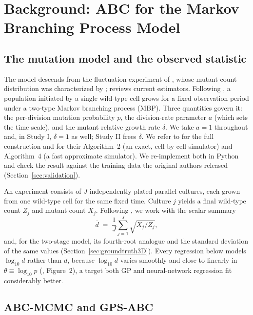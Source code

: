 \documentclass[sn-basic,iicol,pdflatex]{sn-jnl}
\newcommand{\dbar}{\ensuremath{\bar d}}
\begin{document}
\section{Background: ABC for the Markov Branching Process Model}
\label{sec:background}

\subsection{The mutation model and the observed statistic}

The model descends from the fluctuation experiment of \citet{luria1943}, whose mutant-count distribution was characterized by \citet{lea1949}; \citet{zheng2021} reviews current estimators. Following \citet{lu2023}, a population initiated by a single wild-type cell
grows for a fixed observation period under a two-type Markov branching process
(MBP). Three quantities govern it: the per-division mutation probability $p$,
the division-rate parameter $a$ (which sets the time scale), and the mutant
relative growth rate $\delta$. We take $a=1$ throughout and, in Study I,
$\delta=1$ as well; Study II frees $\delta$. We refer to \citet{lu2023} for the full
construction and for their Algorithm~2 (an exact, cell-by-cell simulator) and
Algorithm~4 (a fast approximate simulator). We re-implement both in Python and
check the result against the training data the original authors released
(Section~\ref{sec:validation}).

An experiment consists of $J$ independently plated parallel cultures, each
grown from one wild-type cell for the same fixed time. Culture $j$ yields a
final wild-type count $Z_j$ and mutant count $X_j$. Following
\citeauthor{lu2023}, we work with the scalar summary
\[
\dbar \;=\; \frac{1}{J}\sum_{j=1}^{J} \sqrt{X_j / Z_j},
\]
and, for the two-stage model, its fourth-root analogue and the standard deviation of the same values (Section~\ref{sec:groundtruth3D}).
Every regression below models $\log_{10}\dbar$ rather than $\dbar$, because
$\log_{10}\dbar$ varies smoothly and close to linearly in $\theta \equiv
\log_{10} p$ (\citealp{lu2023}, Figure~2), a target both GP and neural-network
regression fit considerably better.

\subsection{ABC-MCMC and GPS-ABC}
\label{sec:abcmcmc}
\end{document}
